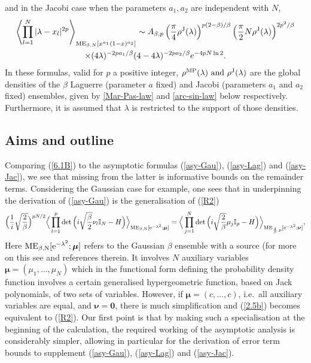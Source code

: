 \documentclass[11pt,a4paper]{article}
\numberwithin{equation}{section} %
\theoremstyle{plain}
\theoremstyle{definition}
\numberwithin{prop}{section}
\numberwithin{cor}{section}
\numberwithin{remark}{section}
\begin{document}
        and in the Jacobi case when the parameters $a_1,a_2$ are independent with $N$, 
            \begin{multline}\label{asy-Jac}
			\left\langle\prod_{l=1}^N |\lambda-x_l|^{2 p}\right\rangle_{\mathrm{ME}_{\beta, N}\left[x^{a_1}(1-x)^{a_2}\right]} \sim A_{\beta, p}\left(\frac{\pi}{4}\rho^{\rm J}(\lambda)\right)^{p(2-\beta)/\beta
            } \left(\frac{\pi}{2 } N\rho^{\rm J}(\lambda)\right)^{2 p^2/\beta}\\
			\times (4 \lambda)^{-2pa_1/\beta}(4-4 \lambda)^{-2p a_2/\beta}  e^{-4 p N \ln 2} .
        \end{multline}
        In these formulas, valid for $p$ a positive integer, 
        $\rho^{\rm MP}(\lambda)\text{ and } \rho^{\rm J}(\lambda) $ are the global densities of the $\beta$  Laguerre (parameter $a$ fixed) and Jacobi (parameters $a_1$ and $a_2$ fixed) ensembles, given by  \eqref{Mar-Pas-law} and \eqref{arc-sin-law} below respectively. Furthermore, it is assumed that $\lambda$ is restricted to the support of those densities.
 
 \subsection{Aims and outline}
Comparing (\ref{6.1B}) to the asymptotic formulas (\ref{asy-Gau}), (\ref{asy-Lag}) and 
(\ref{asy-Jac}), we see that missing from the latter is informative bounds on the remainder terms. Considering the Gaussian case for example, one sees that in \cite{DL14} underpinning the derivation of (\ref{asy-Gau}) is the generalisation of (\ref{R2})
\cite{De09}
 \begin{equation}\label{2.5b}
 \Big ({1 \over i} {\sqrt{2 \over \beta}}  \Big  )^{pN/2} \Big \langle  \prod_{l=1}^p \det \Big ( i \sqrt{\beta \over 2} \nu_l\mathbb I_N - H \Big ) \Big \rangle_{{\rm ME_{\beta,N}[e^{-\lambda^2};\boldsymbol \mu}]} =
\Big  \langle  \prod_{j=1}^N \det \Big ( i \sqrt{2 \over \beta} \mu_j  \mathbb I_p - H \Big ) \Big \rangle_{{\rm ME_{{4 \over \beta},p}[e^{-\lambda^2};\boldsymbol \nu}]},   
    \end{equation} 
Here  ${\rm ME_{\beta,N}[e^{-\lambda^2};\boldsymbol \mu}]$ refers to the Gaussian $\beta$ ensemble with a source (for more on this see \cite[\S 3.5]{Fo25+} and references therein. It involves $N$ auxiliary variables $\boldsymbol \mu = (\mu_1,\dots,\mu_N)$ which in the functional form defining the probability density function involves a certain generalised hypergeometric function, based on Jack polynomials, of two sets of variables. However, if $\boldsymbol \mu =
(c,\dots,c)$, i.e.~all auxiliary variables are equal, and  $\boldsymbol \nu = \mathbf 0$, there is much simplification and (\ref{2.5b}) becomes equivalent to (\ref{R2}). Our first point is that by making such a specialisation at the beginning of the calculation, the required working of the asymptotic analysis is considerably simpler, allowing in particular for the derivation of error term bounds to supplement
(\ref{asy-Gau}), (\ref{asy-Lag}) and 
(\ref{asy-Jac}).
\end{document}
